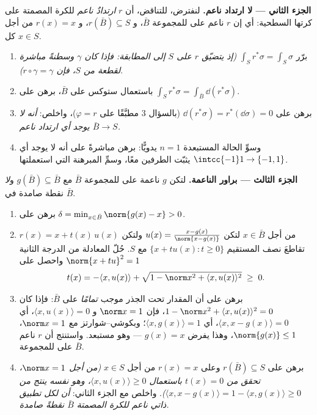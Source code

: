 \begin{problem}
\medskip
\noindent\textbf{الجزء الثاني --- لا ارتداد ناعم.} لنفترض،
للتناقض، أن $r$ \emph{ارتدادٌ ناعم} للكرة المصمتة على كرتها
السطحية: أي إن $r$ ناعم على  للمجموعة $\bar B$، و $r(\bar B) \subseteq S$،
و $r(x) = x$ من أجل كل $x \in S$.
\begin{enumerate}[resume]
  \item برّر $\int_Sr^*\sigma = \int_S\sigma$ \emph{(إذ يتضيّق $r$ على $S$ إلى المطابقة:
        فإذا كان $\gamma$ وسطنةً مباشرة لقطعة من $S$، فإن
        $r\circ\gamma = \gamma$)}.
  \item باستعمال ستوكس على $\bar B$، برهن على $\int_Sr^*\sigma =
        \int_{\bar B}\dd(r^*\sigma)$.
  \item برهن على $\dd(r^*\sigma) = r^*(\dd\sigma) = 0$ (بالسؤال 3 مطبَّقًا على
        $\varphi = r$)، واخلص: \emph{أنه لا يوجد أي ارتداد
        ناعم $\bar B \to S$.}
  \item وسوِّ الحالة المستبعدة $n = 1$ يدويًّا: برهن مباشرةً
        على أنه لا يوجد أي  $\intcc{-1}1 \to
        \{-1, 1\}$ يثبّت الطرفين
        معًا، وسمِّ المبرهنة التي استعملتها.
\end{enumerate}

\medskip
\noindent\textbf{الجزء الثالث --- براور الناعمة.} لتكن $g$
ناعمة على  للمجموعة $\bar B$ مع $g(\bar B)
\subseteq \bar B$ و\emph{لا} نقطة
صامدة في $\bar B$.
\begin{enumerate}[resume]
  \item برهن على $\delta = \min_{x\in\bar B}\norm{g(x) - x} >
        0$.
  \item من أجل $x \in \bar B$ لتكن $u(x) = \frac{x -
        g(x)}{\norm{x - g(x)}}$ ولتكن $r(x) = x +
        t(x)\,u(x)$ تقاطعَ
        نصف المستقيم $\{x + tu(x) : t \geq 0\}$ مع $S$. حُلّ المعادلة من الدرجة
        الثانية $\norm{x + tu}^2 = 1$ واحصل على
        \[
        t(x) = -\langle x, u(x)\rangle +
        \sqrt{1 - \norm x^2 + \langle x, u(x)\rangle^2}
        \;\geq\; 0 .
        \]
  \item برهن على أن المقدار تحت الجذر موجب \emph{تمامًا} على
        $\bar B$: فإذا كان $1 - \norm x^2 + \langle x,
        u(x)\rangle^2 = 0$، فإن $\norm x = 1$ و $\langle
        x, u(x)\rangle = 0$،
        أي $\langle x, x -
        g(x)\rangle = 0$، أي $\langle x, g(x)\rangle =
        1$؛ وبكوشي--شوارتز مع $\norm x = 1$،
        $\norm{g(x)} \leq 1$، وهذا يفرض $g(x) = x$ --- وهو مستبعد. واستنتج
        أن $r$ ناعم على  للمجموعة $\bar B$.
  \item برهن على $r(\bar B) \subseteq S$ وعلى $r(x) = x$ من أجل $x
        \in S$
        \emph{(من أجل $\norm x = 1$، تحقق من $t(x) = 0$
        باستعمال $\langle x, u(x)\rangle \geq 0$، وهو نفسه ينتج من $\langle x, x - g(x)\rangle = 1 -
        \langle x, g(x)\rangle \geq 0$)}. واخلص مع
        الجزء الثاني: \emph{أن لكل تطبيق ذاتي ناعم للكرة
        المصمتة $\bar B$ نقطةً صامدة.}
\end{enumerate}


\end{problem}

